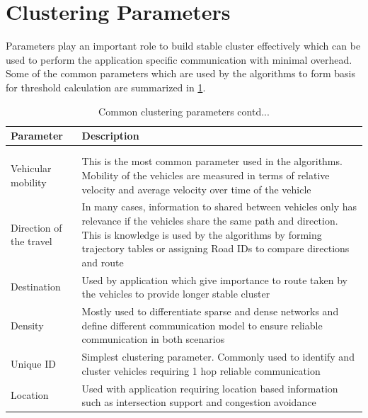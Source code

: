 \documentclass[]{ccs-thesis}
\begin{document}
\section{Clustering Parameters}

Parameters play an important role to build stable cluster effectively which can be used to perform the application
specific communication with minimal overhead. Some of the common parameters which are used by the algorithms to
form basis for threshold calculation are summarized in \cref{tab:parameters}.

\begin{longtable}{>{\raggedright}p{3.5cm}p{7.5cm}}
    \hline
    Parameter               & Description                                                                                                          \\
    \hline
    \endhead
    \hline
    \caption{Common clustering parameters}\label{tab:parameters}                                                                                   \\
    \endfoot
    \hline
    \caption{Common clustering parameters contd...}                                                                                                \\
    \endlastfoot
    Vehicular mobility      & This is the most common parameter used in the algorithms. Mobility of the vehicles are measured in terms of
    relative velocity and average velocity over time of the vehicle                                                                                \\
    Direction of the travel & In many cases, information to shared between vehicles only has relevance if the vehicles share the same path
    and direction. This is knowledge is used by the algorithms by forming trajectory tables or assigning Road IDs
    to compare directions and route                                                                                                                \\
    Destination             & Used by application which give importance to route taken by the vehicles to provide longer stable cluster            \\
    Density                 & Mostly used to differentiate sparse and dense networks and define different communication model to ensure reliable
    communication in both scenarios                                                                                                                \\
    Unique ID               & Simplest clustering parameter. Commonly used to identify and cluster vehicles requiring 1 hop reliable communication \\
    Location                & Used with application requiring location based information such as intersection support and congestion avoidance     \\
\end{longtable}
\end{document}

